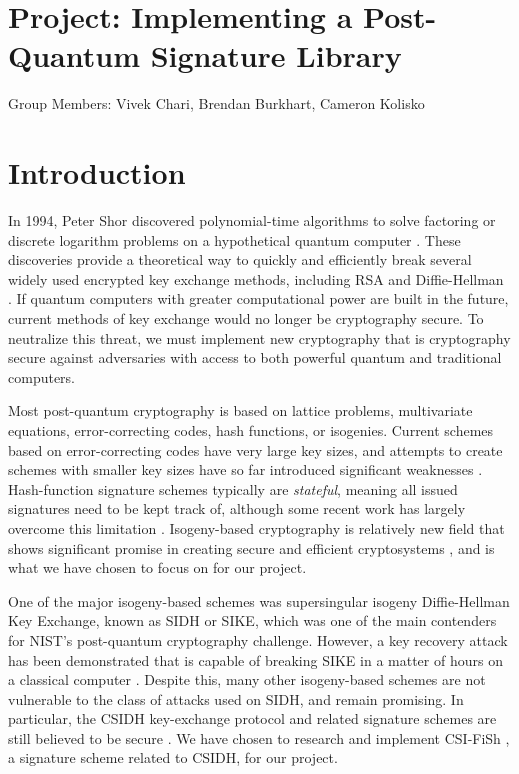 \documentclass{article}
\begin{document}
\begin{flushleft}

\section*{Project: Implementing a Post-Quantum Signature Library}
Group Members: Vivek Chari, Brendan Burkhart, Cameron Kolisko

\section*{Introduction}

In 1994, Peter Shor discovered polynomial-time algorithms to solve factoring
or discrete logarithm problems on a hypothetical quantum computer \cite{ShorBackground}. These discoveries provide a theoretical way to quickly and efficiently break several widely used encrypted key exchange methods, including RSA \cite{ShorRSABreak} and Diffie-Hellman \cite{ShorBackground}. If quantum computers with greater computational power are built in the future, current methods of key exchange would no longer be cryptography secure. To neutralize this threat, we must implement new cryptography that is cryptography secure against adversaries with access to both powerful quantum and traditional computers.

Most post-quantum cryptography is based on lattice problems, multivariate equations, error-correcting codes, hash functions, or isogenies. Current schemes based on error-correcting codes have very large key sizes, and attempts to create schemes with smaller key sizes have so far introduced significant weaknesses \cite{CodeBasedPQ}. Hash-function signature schemes typically are \emph{stateful}, meaning all issued signatures need to be kept track of, although some recent work has largely overcome this limitation \cite{sphincs}. Isogeny-based cryptography is relatively new field that shows significant promise in creating secure and efficient cryptosystems \cite{csifish}, and is what we have chosen to focus on for our project.

One of the major isogeny-based schemes was supersingular isogeny Diffie-Hellman Key Exchange, known as SIDH or SIKE, which was one of the main contenders for NIST's post-quantum cryptography challenge. However, a key recovery attack has been demonstrated that is capable of breaking SIKE in  a matter of hours on a classical computer \cite{SIDHKeyRecovery}. Despite this, many other isogeny-based schemes are not vulnerable to the class of attacks used on SIDH, and remain promising. In particular, the CSIDH key-exchange protocol and related signature schemes are still believed to be secure \cite{CSIFiShStillSecure}. We have chosen to research and implement CSI-FiSh \cite{csifish}, a signature scheme related to CSIDH, for our project.


\end{flushleft}
\end{document}
